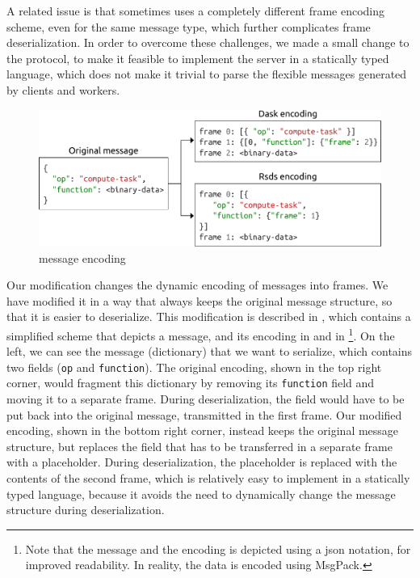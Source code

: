 A related issue is that \dask{} sometimes uses a completely different frame
encoding scheme, even for the same message type, which further complicates frame deserialization.
In order to overcome these challenges, we made a small change to the \dask{}
protocol, to make it feasible to implement the server in a statically typed language, which does
not make it trivial to parse the flexible messages generated by \dask{} clients
and workers.

\begin{figure}
	\centering
	\includegraphics[width=0.9\columnwidth]{./imgs/rsds/frame-encoding}
	\caption{\dask{} message encoding}
	\label{fig:rsds-dask-frame-encoding}
\end{figure}

Our modification changes the dynamic encoding of \dask{} messages into frames.
We have modified it in a way that always keeps the original message structure, so that it is easier
to deserialize. This modification is described in , which contains a
simplified scheme that depicts a \dask{} message, and its encoding in
\dask{} and in \rsds{}\footnote{Note that the message and the encoding is depicted using a \gls{json}
notation, for improved readability. In reality, the data is encoded using MsgPack.}. On the
left, we can see the message (dictionary) that we want to serialize, which contains two fields
(\texttt{op} and \texttt{function}). The original
\dask{} encoding, shown in the top right corner, would fragment this dictionary
by removing its \texttt{function} field and moving it to a separate frame. During
deserialization, the field would have to be put back into the original message, transmitted in the
first frame. Our modified encoding, shown in the bottom right corner, instead keeps the original
message structure, but replaces the field that has to be transferred in a separate frame with a
placeholder. During deserialization, the placeholder is replaced with the contents of the second
frame, which is relatively easy to implement in a statically typed language, because it avoids the
need to dynamically change the message structure during deserialization.


